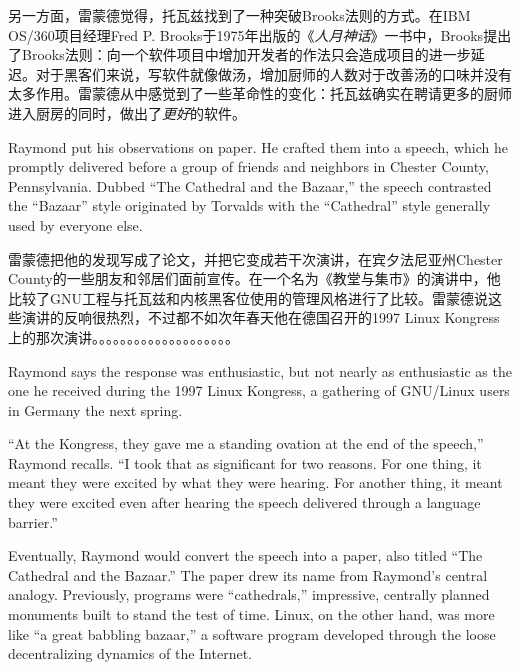 \ifdefined\chs
另一方面，雷蒙德觉得，托瓦兹找到了一种突破Brooks法则的方式。在IBM OS/360项目经理Fred P. Brooks于1975年出版的《\textit{人月神话}》一书中，Brooks提出了Brooks法则：向一个软件项目中增加开发者的作法只会造成项目的进一步延迟。对于黑客们来说，写软件就像做汤，增加厨师的人数对于改善汤的口味并没有太多作用。雷蒙德从中感觉到了一些革命性的变化：托瓦兹确实在聘请更多的厨师进入厨房的同时，做出了\textit{更好}的软件。
\fi

\ifdefined\eng
Raymond put his observations on paper. He crafted them into a speech, which he promptly delivered before a group of friends and neighbors in Chester County, Pennsylvania. Dubbed ``The Cathedral and the Bazaar,'' the speech contrasted the ``Bazaar'' style originated by Torvalds with the ``Cathedral'' style generally used by everyone else.
\fi

\ifdefined\chs
雷蒙德把他的发现写成了论文，并把它变成若干次演讲，在宾夕法尼亚州Chester County的一些朋友和邻居们面前宣传。在一个名为《教堂与集市》的演讲中，他比较了GNU工程与托瓦兹和内核黑客位使用的管理风格进行了比较。雷蒙德说这些演讲的反响很热烈，不过都不如次年春天他在德国召开的1997 Linux Kongress上的那次演讲。。。。。。。。。。。。。。。。。。。。
\fi

\ifdefined\eng
Raymond says the response was enthusiastic, but not nearly as enthusiastic as the one he received during the 1997 Linux Kongress, a gathering of GNU/Linux users in Germany the next spring.
\fi

\ifdefined\chs

\fi

\ifdefined\eng
``At the Kongress, they gave me a standing ovation at the end of the speech,'' Raymond recalls. ``I took that as significant for two reasons. For one thing, it meant they were excited by what they were hearing. For another thing, it meant they were excited even after hearing the speech delivered through a language barrier.''
\fi

\ifdefined\chs

\fi

\ifdefined\eng
Eventually, Raymond would convert the speech into a paper, also titled ``The Cathedral and the Bazaar.'' The paper drew its name from Raymond's central analogy. Previously, programs were ``cathedrals,'' impressive, centrally planned monuments built to stand the test of time. Linux, on the other hand, was more like ``a great babbling bazaar,'' a software program developed through the loose decentralizing dynamics of the Internet.
\fi

